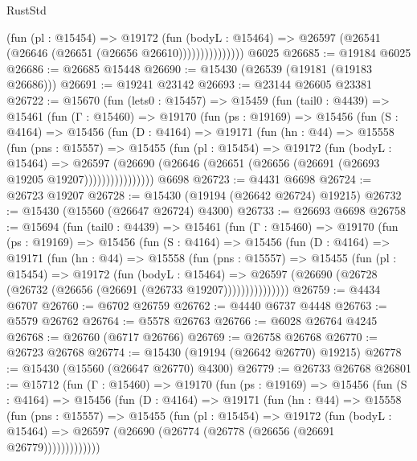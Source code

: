 \begin{lexlean}{RustStd}
\begin{coremodule}
{\begin{coremodule}
{{{{{{{{{{{{{{{{{{{{{{{{{{{{{{{{{{{{{{{{{{{{{{{{{{{{{{{{{{{{                      (fun (pl : @15454) =>
                      @19172
                        (fun (bodyL : @15464) =>
                        @26597 (@26541 (@26646 (@26651 (@26656 @26610)))))))))))))))
    @6025
@26685 := @19184 @6025
@26686 := @26685 @15448
@26690 := @15430 (@26539 (@19181 (@19183 @26686)))
@26691 := @19241 @23142
@26693 := @23144 @26605 @23381
@26722 := @15670
    (fun (lets0 : @15457) =>
    @15459
      (fun (tail0 : @4439) =>
      @15461
        (fun (Γ : @15460) =>
        @19170
          (fun (ps : @19169) =>
          @15456
            (fun (S : @4164) =>
            @15456
              (fun (D : @4164) =>
              @19171
                (fun (hn : @44) =>
                @15558
                  (fun (pns : @15557) =>
                  @15455
                    (fun (pl : @15454) =>
                    @19172
                      (fun (bodyL : @15464) =>
                      @26597
                        (@26690
                          (@26646 (@26651 (@26656 (@26691 (@26693 @19205 @19207))))))))))))))))
    @6698
@26723 := @4431 @6698
@26724 := @26723 @19207
@26728 := @15430 (@19194 (@26642 @26724) @19215)
@26732 := @15430 (@15560 (@26647 @26724) @4300)
@26733 := @26693 @6698
@26758 := @15694
    (fun (tail0 : @4439) =>
    @15461
      (fun (Γ : @15460) =>
      @19170
        (fun (ps : @19169) =>
        @15456
          (fun (S : @4164) =>
          @15456
            (fun (D : @4164) =>
            @19171
              (fun (hn : @44) =>
              @15558
                (fun (pns : @15557) =>
                @15455
                  (fun (pl : @15454) =>
                  @19172
                    (fun (bodyL : @15464) =>
                    @26597 (@26690 (@26728 (@26732 (@26656 (@26691 (@26733 @19207)))))))))))))))
@26759 := @4434 @6707
@26760 := @6702 @26759
@26762 := @4440 @6737 @4448
@26763 := @5579 @26762
@26764 := @5578 @26763
@26766 := @6028 @26764 @4245
@26768 := @26760 (@6717 @26766)
@26769 := @26758 @26768
@26770 := @26723 @26768
@26774 := @15430 (@19194 (@26642 @26770) @19215)
@26778 := @15430 (@15560 (@26647 @26770) @4300)
@26779 := @26733 @26768
@26801 := @15712
    (fun (Γ : @15460) =>
    @19170
      (fun (ps : @19169) =>
      @15456
        (fun (S : @4164) =>
        @15456
          (fun (D : @4164) =>
          @19171
            (fun (hn : @44) =>
            @15558
              (fun (pns : @15557) =>
              @15455
                (fun (pl : @15454) =>
                @19172
                  (fun (bodyL : @15464) =>
                  @26597 (@26690 (@26774 (@26778 (@26656 (@26691 @26779)))))))))))))
}}}}}}}}}}}}}}}}}}}}}}}}}}}}}}}}}}}}}}}}}}}}}}}}}}}}}}}}}}}}
\end{coremodule}}
\end{coremodule}
\end{lexlean}
